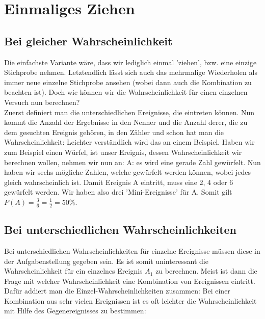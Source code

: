 \section{Einmaliges Ziehen}
	\subsection{Bei gleicher Wahrscheinlichkeit}
		Die einfachste Variante wäre, dass wir lediglich einmal 'ziehen', bzw. eine
		einzige Stichprobe nehmen. Letztendlich lässt sich auch das mehrmalige
		Wiederholen als immer neue einzelne Stichprobe ansehen (wobei dann auch die
		Kombination zu beachten ist). Doch wie können wir die Wahrscheinlichkeit für
		einen einzelnen Versuch nun berechnen?\\
		Zuerst definiert man die unterschiedlichen Ereignisse, die eintreten können.
		Nun kommt die Anzahl der Ergebnisse in den Nenner und die Anzahl derer, die zu
		dem gesuchten Ereignis gehören, in den Zähler und schon hat man die
		Wahrscheinlichkeit:
		\formel{\[P(A)=\frac{Anzahl\ der\ Ereignisse\ von\ A}{Anzahl\ der\ gesamten\
		Ereignisse}=\frac{\#A}{\#\Omega}\]}
		Leichter verständlich wird das an einem	Beispiel. Haben wir zum Beispiel einen
		Würfel, ist unser Ereignis, dessen Wahrscheinlichkeit wir berechnen wollen,
		nehmen wir nun an: A: es wird eine gerade Zahl gewürfelt. Nun haben wir sechs
		mögliche Zahlen, welche gewürfelt werden können, wobei jedes gleich
		wahrscheinlich ist. Damit Ereignis A eintritt, muss eine 2, 4 oder 6 gewürfelt
		werden. Wir haben also drei 'Mini-Ereignisse' für A. Somit gilt
		\(P(A)=\frac{3}{6}=\frac{1}{2}=50\%\).
	
	\subsection{Bei unterschiedlichen Wahrscheinlichkeiten}
		Bei unterschiedlichen Wahrscheinlichkeiten für einzelne Ereignisse müssen
		diese in der Aufgabenstellung gegeben sein. Es ist somit uninteressant die
		Wahrscheinlichkeit für ein einzelnes Ereignis \(A_1\) zu berechnen. Meist ist
		dann die Frage mit welcher Wahrscheinlichkeit eine Kombination von Ereignissen
		eintritt. Dafür addiert man die Einzel-Wahrscheinlichkeiten zusammen:
		\formel{\[P(A)=P(A_1)+P(A_2)+\cdots+P(A_n)\]}
		Bei einer Kombination aus sehr vielen Ereignissen ist es oft leichter die
		Wahrscheinlichkeit mit Hilfe des Gegenereignisses zu bestimmen:
		\formel{\[P(A)=1-P(\bar{A})=1-(P(\bar{A}_1)+P(\bar{A}_2)+\cdots+P(\bar{A}_n))\]}

